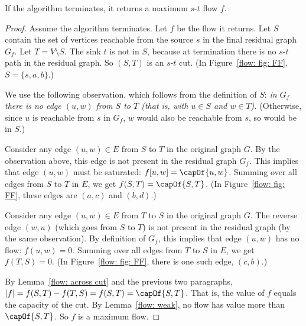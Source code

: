 \begin{theorem}\label{flow: thm: FF}
   If the algorithm terminates, it returns a maximum $s$-$t$ flow $f$.
\end{theorem}
\begin{proof}
  Assume the algorithm terminates.  Let $f$ be the flow it returns.
  Let $S$ contain the set of vertices reachable from the source $s$
  in the final residual graph $G_f$.
  Let $T=V\setminus S$.
  The sink $t$ is not in $S$, because at termination
  there is no $s$-$t$ path in the residual graph.
  So $(S,T)$ is an $s$-$t$ cut.
  (In Figure~\ref{flow: fig: FF}, $S=\{s, a, b\}$.)
  
  We use the following observation, which 
  follows from the definition of $S$:
  \emph{in $G_f$ there is no edge $(u,w)$ from $S$ to $T$
    (that is, with $u\in S$ and $w\in T$).}
  (Otherwise, since $u$ is reachable from $s$ in $G_f$,
  $w$ would also be reachable from $s$, so would be in $S$.)
  
  Consider any edge $(u,w)\in E$ from $S$ to $T$ in the original graph $G$.
  By the observation above,
  this edge is not present in the residual graph $G_f$.
  This implies that edge $(u,w)$ must be saturated: $f[u,w] = \capOf {u,w}$.
  Summing over all edges from $S$ to $T$ in $E$, we get $f(S, T) = \capOf {S, T}$.
  (In Figure~\ref{flow: fig: FF}, these edges are $(a, c)$ and $(b, d)$.) 
  
  Consider any edge $(u,w)\in E$ from $T$ to $S$ in the original graph $G$.
  The reverse edge $(w, u)$ (which goes from $S$ to $T$) is not present in the residual graph
  (by the same observation).
  By definition of $G_f$, this implies that edge $(u,w)$ has no flow: $f(u,w) = 0$.
  Summing over all edges from $T$ to $S$ in $E$, we get $f(T, S) = 0$.
  (In Figure~\ref{flow: fig: FF}, there is one such edge, $(c, b)$.) 

  By Lemma~\ref{flow: across cut} and the previous two paragraphs,
  $|f| = f(S,T) - f(T,S) = f(S, T) = \capOf {S, T}$.
  That is, the value of $f$ equals the capacity of the cut.
  By Lemma~\ref{flow: weak},
  no flow has value more than $\capOf {S, T}$.
  So $f$ is a maximum flow.
\end{proof}


